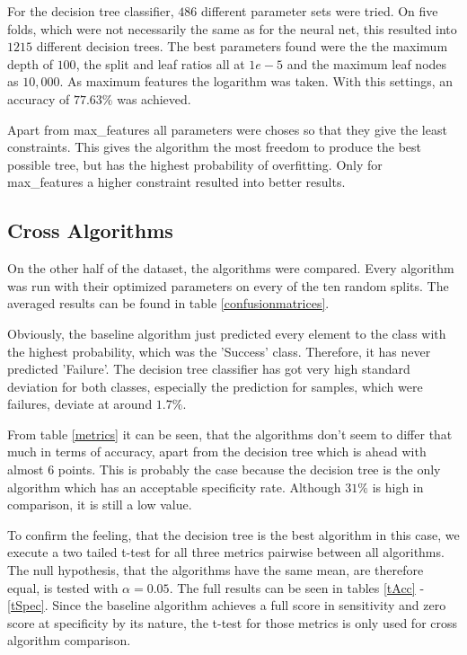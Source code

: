 \documentclass[a4paper,11pt]{article}
\begin{document}
For the decision tree classifier, $486$ different parameter sets were tried. On five folds, which were not necessarily the same as for the neural net, this resulted into $1215$ different decision trees.
The best parameters found were the the maximum depth of $100$, the split and leaf ratios all at $1e-5$ and the maximum leaf nodes as $10,000$. As maximum features the logarithm was taken. With this settings, an accuracy of $77.63\%$ was achieved. 

Apart from max\_features all parameters were choses so that they give the least constraints. This gives the algorithm the most freedom to produce the best possible tree, but has the highest probability of overfitting. Only for max\_features a higher constraint resulted into better results.

\subsection{Cross Algorithms}





On the other half of the dataset, the algorithms were compared. Every algorithm was run with their optimized parameters on every of the ten random splits. The averaged results can be found in table \ref{confusionmatrices}.

Obviously, the baseline algorithm just predicted every element to the class with the highest probability, which was the 'Success' class. Therefore, it has never predicted 'Failure'. The decision tree classifier has got very high standard deviation for both classes, especially the prediction for samples, which were failures, deviate at around $1.7\%$. 

From table \ref{metrics} it can be seen, that the algorithms don't seem to differ that much in terms of accuracy, apart from the decision tree which is ahead with almost $6$ points. This is probably the case because the decision tree is the only algorithm which has an acceptable specificity rate. Although $31\%$ is high in comparison, it is still a low value. 

To confirm the feeling, that the decision tree is the best algorithm in this case, we execute a two tailed t-test for all three metrics pairwise between all algorithms. The null hypothesis, that the algorithms have the same mean, are therefore equal, is tested with $\alpha = 0.05$. The full results can be seen in tables \ref{tAcc} - \ref{tSpec}.
Since the baseline algorithm achieves a full score in sensitivity and zero score at specificity by its nature, the t-test for those metrics is only used for cross algorithm comparison. 
\end{document}
